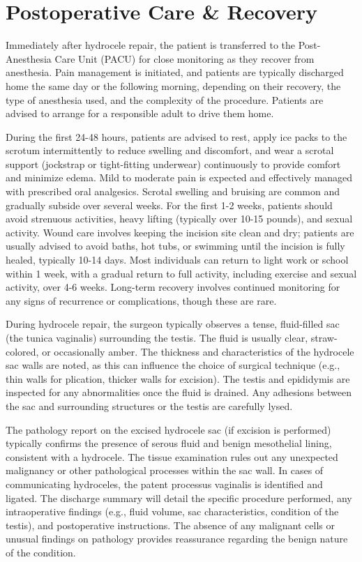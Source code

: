 \section*{Postoperative Care \& Recovery}
Immediately after hydrocele repair, the patient is transferred to the Post-Anesthesia Care Unit (PACU) for close monitoring as they recover from anesthesia. Pain management is initiated, and patients are typically discharged home the same day or the following morning, depending on their recovery, the type of anesthesia used, and the complexity of the procedure. Patients are advised to arrange for a responsible adult to drive them home.

During the first 24-48 hours, patients are advised to rest, apply ice packs to the scrotum intermittently to reduce swelling and discomfort, and wear a scrotal support (jockstrap or tight-fitting underwear) continuously to provide comfort and minimize edema. Mild to moderate pain is expected and effectively managed with prescribed oral analgesics. Scrotal swelling and bruising are common and gradually subside over several weeks. For the first 1-2 weeks, patients should avoid strenuous activities, heavy lifting (typically over 10-15 pounds), and sexual activity. Wound care involves keeping the incision site clean and dry; patients are usually advised to avoid baths, hot tubs, or swimming until the incision is fully healed, typically 10-14 days. Most individuals can return to light work or school within 1 week, with a gradual return to full activity, including exercise and sexual activity, over 4-6 weeks. Long-term recovery involves continued monitoring for any signs of recurrence or complications, though these are rare.

During hydrocele repair, the surgeon typically observes a tense, fluid-filled sac (the tunica vaginalis) surrounding the testis. The fluid is usually clear, straw-colored, or occasionally amber. The thickness and characteristics of the hydrocele sac walls are noted, as this can influence the choice of surgical technique (e.g., thin walls for plication, thicker walls for excision). The testis and epididymis are inspected for any abnormalities once the fluid is drained. Any adhesions between the sac and surrounding structures or the testis are carefully lysed.

The pathology report on the excised hydrocele sac (if excision is performed) typically confirms the presence of serous fluid and benign mesothelial lining, consistent with a hydrocele. The tissue examination rules out any unexpected malignancy or other pathological processes within the sac wall. In cases of communicating hydroceles, the patent processus vaginalis is identified and ligated. The discharge summary will detail the specific procedure performed, any intraoperative findings (e.g., fluid volume, sac characteristics, condition of the testis), and postoperative instructions. The absence of any malignant cells or unusual findings on pathology provides reassurance regarding the benign nature of the condition.

